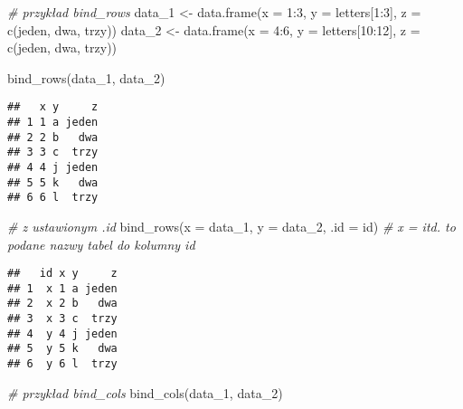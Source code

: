 \documentclass[
]{book}
\newenvironment{Shaded}{\begin{snugshade}}{\end{snugshade}}
\newcommand{\AttributeTok}[1]{\textcolor[rgb]{0.77,0.63,0.00}{#1}}
\newcommand{\CommentTok}[1]{\textcolor[rgb]{0.56,0.35,0.01}{\textit{#1}}}
\newcommand{\DecValTok}[1]{\textcolor[rgb]{0.00,0.00,0.81}{#1}}
\newcommand{\FunctionTok}[1]{\textcolor[rgb]{0.00,0.00,0.00}{#1}}
\newcommand{\NormalTok}[1]{#1}
\newcommand{\OtherTok}[1]{\textcolor[rgb]{0.56,0.35,0.01}{#1}}
\newcommand{\SpecialCharTok}[1]{\textcolor[rgb]{0.00,0.00,0.00}{#1}}
\newcommand{\StringTok}[1]{\textcolor[rgb]{0.31,0.60,0.02}{#1}}
\begin{document}
\begin{Shaded}
\begin{Highlighting}[]
\CommentTok{\# przykład bind\_rows}
\NormalTok{data\_1 }\OtherTok{\textless{}{-}} \FunctionTok{data.frame}\NormalTok{(}\AttributeTok{x =} \DecValTok{1}\SpecialCharTok{:}\DecValTok{3}\NormalTok{, }\AttributeTok{y =}\NormalTok{ letters[}\DecValTok{1}\SpecialCharTok{:}\DecValTok{3}\NormalTok{], }\AttributeTok{z =} \FunctionTok{c}\NormalTok{(}\StringTok{\textquotesingle{}jeden\textquotesingle{}}\NormalTok{, }\StringTok{\textquotesingle{}dwa\textquotesingle{}}\NormalTok{, }\StringTok{\textquotesingle{}trzy\textquotesingle{}}\NormalTok{))}
\NormalTok{data\_2 }\OtherTok{\textless{}{-}} \FunctionTok{data.frame}\NormalTok{(}\AttributeTok{x =} \DecValTok{4}\SpecialCharTok{:}\DecValTok{6}\NormalTok{, }\AttributeTok{y =}\NormalTok{ letters[}\DecValTok{10}\SpecialCharTok{:}\DecValTok{12}\NormalTok{], }\AttributeTok{z =} \FunctionTok{c}\NormalTok{(}\StringTok{\textquotesingle{}jeden\textquotesingle{}}\NormalTok{, }\StringTok{\textquotesingle{}dwa\textquotesingle{}}\NormalTok{, }\StringTok{\textquotesingle{}trzy\textquotesingle{}}\NormalTok{))}

\FunctionTok{bind\_rows}\NormalTok{(data\_1, data\_2)}
\end{Highlighting}
\end{Shaded}

\begin{verbatim}
##   x y     z
## 1 1 a jeden
## 2 2 b   dwa
## 3 3 c  trzy
## 4 4 j jeden
## 5 5 k   dwa
## 6 6 l  trzy
\end{verbatim}

\begin{Shaded}
\begin{Highlighting}[]
\CommentTok{\# z ustawionym .id}
\FunctionTok{bind\_rows}\NormalTok{(}\AttributeTok{x =}\NormalTok{ data\_1, }\AttributeTok{y =}\NormalTok{ data\_2, }\AttributeTok{.id =} \StringTok{\textquotesingle{}id\textquotesingle{}}\NormalTok{) }\CommentTok{\# x =  itd. to podane nazwy tabel do kolumny id}
\end{Highlighting}
\end{Shaded}

\begin{verbatim}
##   id x y     z
## 1  x 1 a jeden
## 2  x 2 b   dwa
## 3  x 3 c  trzy
## 4  y 4 j jeden
## 5  y 5 k   dwa
## 6  y 6 l  trzy
\end{verbatim}

\begin{Shaded}
\begin{Highlighting}[]
\CommentTok{\# przykład bind\_cols}
\FunctionTok{bind\_cols}\NormalTok{(data\_1, data\_2)}
\end{Highlighting}
\end{Shaded}
\end{document}
